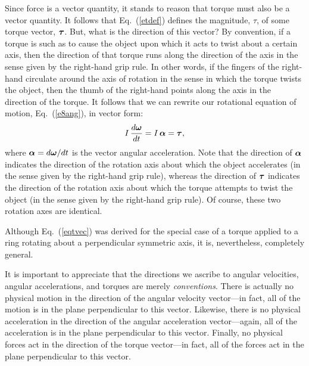 Since force is a vector quantity, it stands to reason that torque must also be a vector
quantity. It follows that Eq.~(\ref{etdef}) defines the magnitude, $\tau$, of some torque vector, $\mbox{\boldmath$\tau$}$.
But, what is the direction of this vector? By convention, if a torque is such as to cause the
object upon which it acts to twist about a certain axis, then the direction of that
torque runs along the direction of the axis in the sense given by the right-hand grip rule.
In other words, if the fingers of the right-hand circulate around the axis of rotation  in the sense
in which the torque twists the object, then the thumb of the right-hand
points along the axis in the direction of the torque. It follows that we can rewrite our
rotational equation of motion, Eq.~(\ref{e8ang}), in vector form:
\begin{equation}\label{eqtvec}
I\,\frac{d\mbox{\boldmath$\omega$}}{dt} = I\,\mbox{\boldmath$\alpha$}= \mbox{\boldmath$\tau$},
\end{equation}
where $\mbox{\boldmath$\alpha$} = d\mbox{\boldmath$\omega$}/dt$ is the vector angular acceleration. Note that the
direction of $\mbox{\boldmath$\alpha$}$ indicates the direction of the rotation axis about which the object
accelerates (in the sense given by the right-hand grip rule), whereas the direction
of $\mbox{\boldmath$\tau$}$ indicates the direction of the  rotation axis about which the torque attempts
to twist the object (in the sense given by the right-hand grip rule). Of course, these two
 rotation axes are identical. 

Although Eq.~(\ref{eqtvec}) was derived for the special case of a torque
applied to a ring rotating about a perpendicular symmetric axis, it is, nevertheless, completely
general.

It is important to appreciate that the directions  we 
ascribe to angular velocities, angular
accelerations, and torques are merely {\em conventions}. There is actually no physical motion
in the direction of the angular velocity vector---in fact, all of the motion is in the
plane perpendicular to this vector. Likewise, there is  no physical acceleration
in the direction of the angular acceleration vector---again, all of the acceleration is in the
plane perpendicular to this vector. Finally, no physical forces act
in the direction of the torque vector---in fact, all of the forces act in the plane
perpendicular to this vector.

